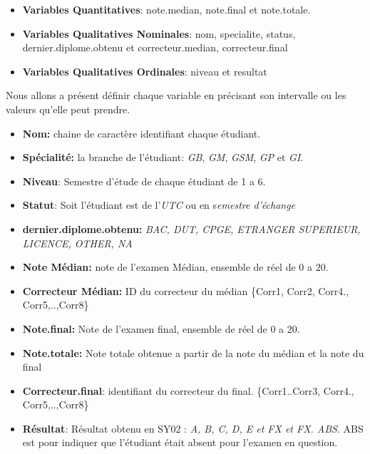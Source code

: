 \documentclass[10pt]{article}
\begin{document}
\begin{itemize}
	  	\item \textbf{Variables Quantitatives}: note.median, note.final et  note.totale.
		\item  \textbf{Variables Qualitatives Nominales}: nom, specialite, status, dernier.diplome.obtenu et correcteur.median, correcteur.final
		\item  \textbf{Variables Qualitatives Ordinales}: niveau et resultat  \\
\end{itemize}
 Nous allons a présent définir  chaque variable en précisant son intervalle ou les valeurs qu'elle peut prendre.

\begin{itemize}
	\item \textbf{Nom:} chaine de caractère identifiant chaque étudiant.
	\item \textbf{Spécialité:} la branche de l'étudiant: \textit{GB}, \textit{GM}, \textit{GSM}, \textit{GP} et \textit{GI}.
	\item \textbf{Niveau}: Semestre d'étude de chaque étudiant de 1 a 6.
	\item \textbf{Statut}: Soit l'étudiant est de l'\textit{UTC} ou en s\textit{emestre d'échange}
	\item \textbf{dernier.diplome.obtenu:}
	\textit{BAC, DUT, CPGE, ETRANGER SUPERIEUR, LICENCE, OTHER, NA}
	\item \textbf{Note Médian:} note de l'examen Médian, ensemble de réel de 0 a 20.
	\item \textbf{Correcteur Médian:} ID du correcteur du médian \{Corr1, Corr2, Corr4., Corr5,..,Corr8\}
	\item \textbf{Note.final:} Note de l'examen final, ensemble de réel de 0 a 20.
	\item \textbf{Note.totale:} Note totale obtenue a partir de la note du médian et la note du final
	\item \textbf{Correcteur.final}: identifiant  du correcteur du final. \{Corr1..Corr3, Corr4., Corr5,..,Corr8\}
	\item \textbf{Résultat}: Résultat obtenu en SY02 : \textit{A, B, C, D, E et FX et FX. ABS}. ABS est pour indiquer que l'étudiant était absent pour l'examen en question.
\end{itemize}
\end{document}
